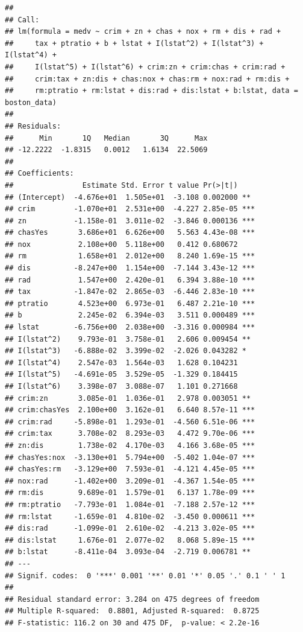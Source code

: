 \documentclass[
]{article}
\begin{document}
\begin{verbatim}
## 
## Call:
## lm(formula = medv ~ crim + zn + chas + nox + rm + dis + rad + 
##     tax + ptratio + b + lstat + I(lstat^2) + I(lstat^3) + I(lstat^4) + 
##     I(lstat^5) + I(lstat^6) + crim:zn + crim:chas + crim:rad + 
##     crim:tax + zn:dis + chas:nox + chas:rm + nox:rad + rm:dis + 
##     rm:ptratio + rm:lstat + dis:rad + dis:lstat + b:lstat, data = boston_data)
## 
## Residuals:
##      Min       1Q   Median       3Q      Max 
## -12.2222  -1.8315   0.0012   1.6134  22.5069 
## 
## Coefficients:
##                Estimate Std. Error t value Pr(>|t|)    
## (Intercept)  -4.676e+01  1.505e+01  -3.108 0.002000 ** 
## crim         -1.070e+01  2.531e+00  -4.227 2.85e-05 ***
## zn           -1.158e-01  3.011e-02  -3.846 0.000136 ***
## chasYes       3.686e+01  6.626e+00   5.563 4.43e-08 ***
## nox           2.108e+00  5.118e+00   0.412 0.680672    
## rm            1.658e+01  2.012e+00   8.240 1.69e-15 ***
## dis          -8.247e+00  1.154e+00  -7.144 3.43e-12 ***
## rad           1.547e+00  2.420e-01   6.394 3.88e-10 ***
## tax          -1.847e-02  2.865e-03  -6.446 2.83e-10 ***
## ptratio       4.523e+00  6.973e-01   6.487 2.21e-10 ***
## b             2.245e-02  6.394e-03   3.511 0.000489 ***
## lstat        -6.756e+00  2.038e+00  -3.316 0.000984 ***
## I(lstat^2)    9.793e-01  3.758e-01   2.606 0.009454 ** 
## I(lstat^3)   -6.888e-02  3.399e-02  -2.026 0.043282 *  
## I(lstat^4)    2.547e-03  1.564e-03   1.628 0.104231    
## I(lstat^5)   -4.691e-05  3.529e-05  -1.329 0.184415    
## I(lstat^6)    3.398e-07  3.088e-07   1.101 0.271668    
## crim:zn       3.085e-01  1.036e-01   2.978 0.003051 ** 
## crim:chasYes  2.100e+00  3.162e-01   6.640 8.57e-11 ***
## crim:rad     -5.898e-01  1.293e-01  -4.560 6.51e-06 ***
## crim:tax      3.708e-02  8.293e-03   4.472 9.70e-06 ***
## zn:dis        1.738e-02  4.170e-03   4.166 3.68e-05 ***
## chasYes:nox  -3.130e+01  5.794e+00  -5.402 1.04e-07 ***
## chasYes:rm   -3.129e+00  7.593e-01  -4.121 4.45e-05 ***
## nox:rad      -1.402e+00  3.209e-01  -4.367 1.54e-05 ***
## rm:dis        9.689e-01  1.579e-01   6.137 1.78e-09 ***
## rm:ptratio   -7.793e-01  1.084e-01  -7.188 2.57e-12 ***
## rm:lstat     -1.659e-01  4.810e-02  -3.450 0.000611 ***
## dis:rad      -1.099e-01  2.610e-02  -4.213 3.02e-05 ***
## dis:lstat     1.676e-01  2.077e-02   8.068 5.89e-15 ***
## b:lstat      -8.411e-04  3.093e-04  -2.719 0.006781 ** 
## ---
## Signif. codes:  0 '***' 0.001 '**' 0.01 '*' 0.05 '.' 0.1 ' ' 1
## 
## Residual standard error: 3.284 on 475 degrees of freedom
## Multiple R-squared:  0.8801, Adjusted R-squared:  0.8725 
## F-statistic: 116.2 on 30 and 475 DF,  p-value: < 2.2e-16
\end{verbatim}
\end{document}
